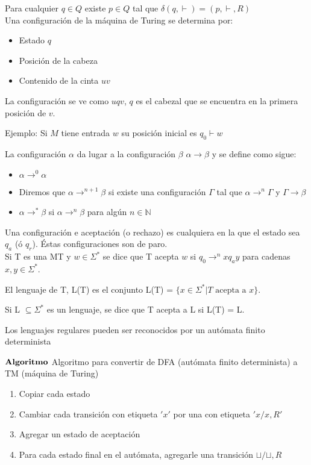 \documentclass{homework}
\begin{document}
Para cualquier $q \in Q$ existe $p \in Q$ tal que $\delta(q, \vdash) = (p, \vdash, R)$\\

Una configuración de la máquina de Turing se determina por:
\begin{itemize}
	\item Estado $q$
	\item Posición de la cabeza
	\item Contenido de la cinta $uv$
\end{itemize}
La configuración se ve como $uqv$, $q$ es el cabezal que se encuentra en la primera posición de $v$.

Ejemplo: Si $M$ tiene entrada $w$ su posición inicial es $q_0 \vdash w$

La configuración $\alpha$ da lugar a la configuración $\beta$ $\alpha \rightarrow \beta$ y se define como sigue:
\begin{itemize}
	\item $\alpha \rightarrow^{0} \alpha$
	\item Diremos que $\alpha \rightarrow^{n+1} \beta$ si existe una configuración $\Gamma$ tal que $\alpha \rightarrow^{n} \Gamma$ y $\Gamma \rightarrow \beta$
	\item $\alpha \rightarrow^{*} \beta$ si $\alpha \rightarrow^{n} \beta$ para algún $n \in \mathds{N}$
\end{itemize}

Una configuración e aceptación (o rechazo) es cualquiera en la que el estado sea $q_a$ (ó $q_r$). Éstas configuraciones son de paro.\\

Si T es una MT y $w \in \Sigma^{*}$ se dice que T acepta $w$ si $q_0 \rightarrow^{n} xq_ay$ para cadenas $x, y \in \Sigma^{*}$.

El lenguaje de T, L(T) es el conjunto L(T) = $\{x \in \Sigma^{*} | T \text{ acepta a } x\}$.

Si L $\subseteq \Sigma^{*}$ es un lenguaje, se dice que T acepta a L si L(T) = L.

Los lenguajes regulares pueden ser reconocidos por un autómata finito determinista 

$\bf{Algoritmo}$ Algoritmo para convertir de DFA (autómata finito determinista) a TM (máquina de Turing)
\begin{enumerate}
	\item Copiar cada estado
	\item Cambiar cada transición con etiqueta $'x'$ por una con etiqueta $'x/x,R'$
	\item Agregar un estado de aceptación
	\item Para cada estado final en el autómata, agregarle una transición $\sqcup / \sqcup, R$
\end{enumerate}
\end{document}
